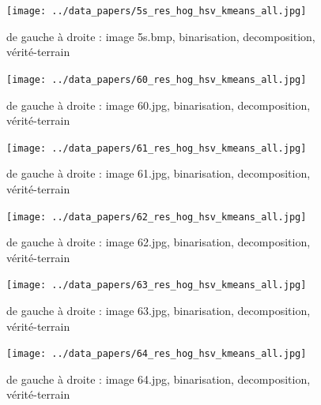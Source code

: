\documentclass{book}
\begin{document}
\begin{figure}[H]
\begin{center}
\texttt{[image: ../data\_papers/5s\_res\_hog\_hsv\_kmeans\_all.jpg]}
\end{center}
\caption{de gauche à droite : image 5s.bmp, binarisation, decomposition, vérité-terrain}
\label{5s}
\end{figure}
\clearpage


\begin{figure}[H]
\begin{center}
\texttt{[image: ../data\_papers/60\_res\_hog\_hsv\_kmeans\_all.jpg]}
\end{center}
\caption{de gauche à droite : image 60.jpg, binarisation, decomposition, vérité-terrain}
\label{60}
\end{figure}
\clearpage


\begin{figure}[H]
\begin{center}
\texttt{[image: ../data\_papers/61\_res\_hog\_hsv\_kmeans\_all.jpg]}
\end{center}
\caption{de gauche à droite : image 61.jpg, binarisation, decomposition, vérité-terrain}
\label{61}
\end{figure}
\clearpage


\begin{figure}[H]
\begin{center}
\texttt{[image: ../data\_papers/62\_res\_hog\_hsv\_kmeans\_all.jpg]}
\end{center}
\caption{de gauche à droite : image 62.jpg, binarisation, decomposition, vérité-terrain}
\label{62}
\end{figure}
\clearpage


\begin{figure}[H]
\begin{center}
\texttt{[image: ../data\_papers/63\_res\_hog\_hsv\_kmeans\_all.jpg]}
\end{center}
\caption{de gauche à droite : image 63.jpg, binarisation, decomposition, vérité-terrain}
\label{63}
\end{figure}
\clearpage


\begin{figure}[H]
\begin{center}
\texttt{[image: ../data\_papers/64\_res\_hog\_hsv\_kmeans\_all.jpg]}
\end{center}
\caption{de gauche à droite : image 64.jpg, binarisation, decomposition, vérité-terrain}
\label{64}
\end{figure}
\clearpage
\end{document}
